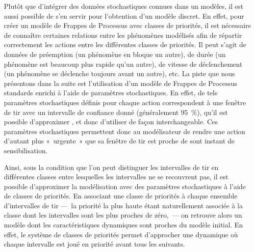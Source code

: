 \myskip


Plutôt que d'intégrer des données stochastiques connues dans un modèles,
il est aussi possible de s'en servir pour l'obtention d'un modèle discret.
En effet, pour créer un modèle de Frappes de Processus avec classes de priorités,
il est nécessaire de connaître certaines relations entre les phénomènes modélisés
afin de répartir correctement les actions entre les différentes classes de priorités.
Il peut s'agit de données de préemption (un phénomène en bloque un autre),
de durée (un phénomène est beaucoup plus rapide qu'un autre),
de vitesse de déclenchement (un phénomène se déclenche toujours avant un autre), etc.
La piste que nous présentons dans la suite est l'utilisation d'un modèle de Frappes de Processus
standards enrichi à l'aide de paramètres stochastiques.
En effet, de tels paramètres stochastiques définis pour chaque action correspondent
à une fenêtre de tir avec un intervalle de confiance donné (généralement 95~\%),
qu'il est possible d'approximer \cite[p.~72]{Pauleve11},
et donc d'utiliser de façon interchangeable.
Ces paramètres stochastiques permettent donc au modélisateur de rendre une action
d'autant plus «~urgente~» que sa fenêtre de tir est proche de sont instant
de sensibilisation.

Ainsi, sous la condition que l'on peut distinguer les intervalles de tir en différentes classes
entre lesquelles les intervalles ne se recouvrent pas,
il est possible d'approximer la modélisation avec des paramètres stochastiques à
l'aide de classes de priorités.
En associant une classe de priorités à chaque ensemble d'intervalles de tir
---~la priorité la plus haute étant naturellement associée à la classe dont les intervalles
sont les plus proches de zéro,~---
on retrouve alors un modèle dont les caractéristiques dynamiques sont proches
du modèle initial.
En effet, le système de classes de priorités permet d'approcher une dynamique où
chaque intervalle est joué en priorité avant tous les suivants.

